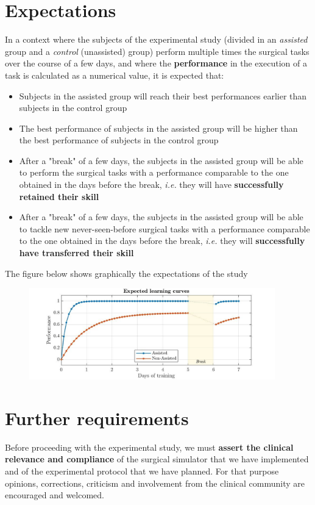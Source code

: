 \documentclass{article}
\begin{document}
\section{Expectations}
In a context where the subjects of the experimental study (divided in an \textit{assisted} group and a \textit{control} (unassisted) group) perform multiple times the surgical tasks over the course of a few days, and where the \textbf{performance} in the execution of a task is calculated as a numerical value, it is expected that:
\begin{itemize}
  \item Subjects in the assisted group will reach their best performances earlier than subjects in the control group
  \item The best performance of subjects in the assisted group will be higher than the best performance of subjects in the control group
  \item After a "break" of a few days, the subjects in the assisted group will be able to perform the surgical tasks with a performance comparable to the one obtained in the days before the break, \textit{i.e.} they will have \textbf{successfully retained their skill}
  \item After a "break" of a few days, the subjects in the assisted group will be able to tackle new never-seen-before surgical tasks with a performance comparable to the one obtained in the days before the break, \textit{i.e.} they will \textbf{successfully have transferred their skill}
\end{itemize} 
The figure below shows graphically the expectations of the study

\begin{figure}[!h]
  \centering
  \includegraphics[width=0.95\textwidth]{expected.jpg}
\end{figure} 
\section{Further requirements}
Before proceeding with the experimental study, we must \textbf{assert the clinical relevance and compliance} of the surgical simulator that we have implemented and of the experimental protocol that we have planned. For that purpose opinions, corrections, criticism and involvement from the clinical community are encouraged and welcomed. 
\end{document}
